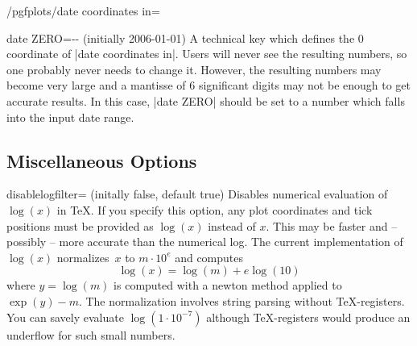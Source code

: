 \begin{stylekey}{/pgfplots/date coordinates in=}
\begin{codeexample}[]
\end{codeexample}
\end{stylekey}

\begin{pgfplotskey}{date ZERO=-- (initially 2006-01-01)}
	A technical key which defines the $0$ coordinate of |date coordinates in|. Users will never see the resulting numbers, so one probably never needs to change it. However, the resulting numbers may become very large and a mantisse of 6 significant digits may not be enough to get accurate results. In this case, |date ZERO| should be set to a number which falls into the input date range.
\end{pgfplotskey}




\subsection{Miscellaneous Options}

\begin{pgfplotskey}{disablelogfilter= (initally false, default true)}
Disables numerical evaluation of $\log(x)$ in \TeX. If you specify this option, any plot coordinates and tick positions must be provided as $\log(x)$ instead of $x$. This may be faster and -- possibly -- more accurate than the numerical log. The current implementation of $\log(x)$ normalizes~$x$ to $m\cdot 10^e$ and computes
\[ \log(x) = \log(m) + e \log(10) \]
where $y = \log(m)$ is computed with a newton method applied to $\exp(y) - m$. The normalization involves string parsing without \TeX-registers. You can savely evaluate $\log(1\cdot 10^{-7})$ although \TeX-registers would produce an underflow for such small numbers. 
\end{pgfplotskey}

